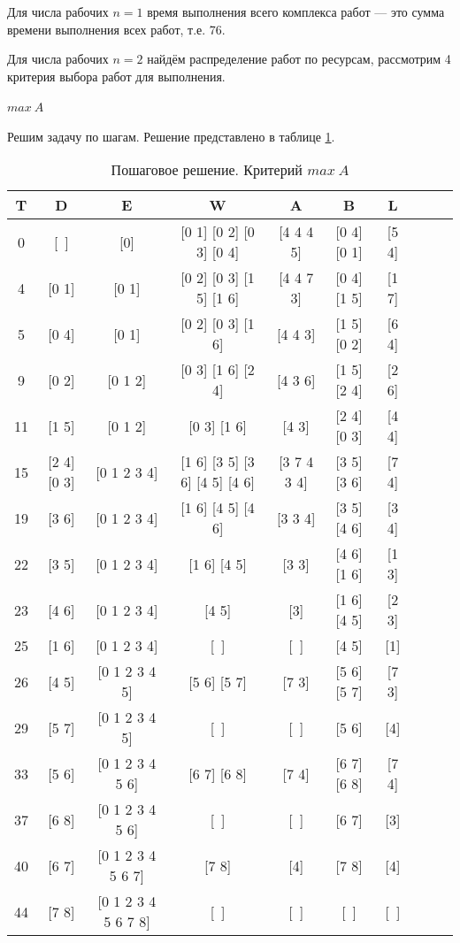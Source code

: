 Для числа рабочих $n = 1$ время выполнения всего комплекса работ --- это сумма времени выполнения всех работ, т.е. 76.

Для числа рабочих $n = 2$ найдём распределение работ по
ресурсам, рассмотрим 4 критерия выбора работ для выполнения.

\paragraph{$max\ A$} Решим задачу по шагам. Решение представлено в таблице \ref{tab:maxa}.

\begin{table}[H]
\begin{center}
	\def\tabcolsep{2pt}
	\caption{Пошаговое решение. Критерий $max\ A$}
	\label{tab:maxa}
	\begin{tabular}{|c|c|c|c|c|c|c|c|c|c|}
	\hline 
	T & D & E & W & A & B & L\\ \hline
	0 & [~] & [0] & [0 1] [0 2] [0 3] [0 4] & [4 4 4 5] & [0 4] [0 1] & [5 4] \\ \hline
4 & [0 1] & [0 1] & [0 2] [0 3] [1 5] [1 6] & [4 4 7 3] & [0 4] [1 5] & [1 7] \\ \hline
5 & [0 4] & [0 1] & [0 2] [0 3] [1 6] & [4 4 3] & [1 5] [0 2] & [6 4] \\ \hline
9 & [0 2] & [0 1 2] & [0 3] [1 6] [2 4] & [4 3 6] & [1 5] [2 4] & [2 6] \\ \hline
11 & [1 5] & [0 1 2] & [0 3] [1 6] & [4 3] & [2 4] [0 3] & [4 4] \\ \hline
15 & [2 4] [0 3] & [0 1 2 3 4] & [1 6] [3 5] [3 6] [4 5] [4 6] & [3 7 4 3 4] & [3 5] [3 6] & [7 4] \\ \hline
19 & [3 6] & [0 1 2 3 4] & [1 6] [4 5] [4 6] & [3 3 4] & [3 5] [4 6] & [3 4] \\ \hline
22 & [3 5] & [0 1 2 3 4] & [1 6] [4 5] & [3 3] & [4 6] [1 6] & [1 3] \\ \hline
23 & [4 6] & [0 1 2 3 4] & [4 5] & [3] & [1 6] [4 5] & [2 3] \\ \hline
25 & [1 6] & [0 1 2 3 4] & [~] & [~] & [4 5] & [1] \\ \hline
26 & [4 5] & [0 1 2 3 4 5] & [5 6] [5 7] & [7 3] & [5 6] [5 7] & [7 3] \\ \hline
29 & [5 7] & [0 1 2 3 4 5] & [~] & [~] & [5 6] & [4] \\ \hline
33 & [5 6] & [0 1 2 3 4 5 6] & [6 7] [6 8] & [7 4] & [6 7] [6 8] & [7 4] \\ \hline
37 & [6 8] & [0 1 2 3 4 5 6] & [~] & [~] & [6 7] & [3] \\ \hline
40 & [6 7] & [0 1 2 3 4 5 6 7] & [7 8] & [4] & [7 8] & [4] \\ \hline
44 & [7 8] & [0 1 2 3 4 5 6 7 8] & [~] & [~] & [~] & [~] \\ \hline
	\end{tabular} 
\end{center}
\end{table}

